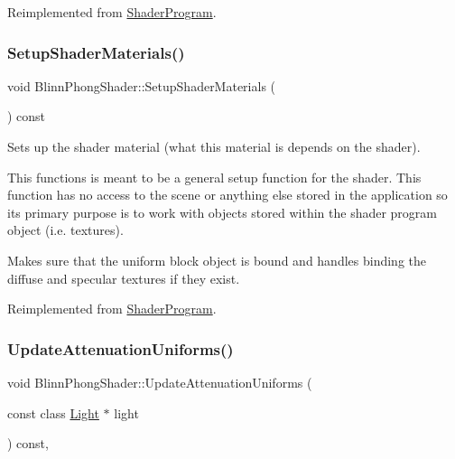 Reimplemented from \hyperlink{class_shader_program_a02cf3df43c59808160fce158ad655a40}{Shader\+Program}.

\hypertarget{class_blinn_phong_shader_a444db9ffe3d55dbbb55ced8cf4abb705}{}\label{class_blinn_phong_shader_a444db9ffe3d55dbbb55ced8cf4abb705}
\subsubsection{\texorpdfstring{Setup\+Shader\+Materials()}{SetupShaderMaterials()}}
{\footnotesize\ttfamily void Blinn\+Phong\+Shader\+::\+Setup\+Shader\+Materials (\begin{DoxyParamCaption}{ }\end{DoxyParamCaption}) const\hspace{0.3cm}{\ttfamily [virtual]}}



Sets up the shader material (what this material is depends on the shader).

This functions is meant to be a general setup function for the shader. This function has no access to the scene or anything else stored in the application so its primary purpose is to work with objects stored within the shader program object (i.\+e. textures).

Makes sure that the uniform block object is bound and handles binding the diffuse and specular textures if they exist.

Reimplemented from \hyperlink{class_shader_program_a20ea5669f122fa6143e7fa8ee9d92578}{Shader\+Program}.

\hypertarget{class_blinn_phong_shader_a389b3b5fea85eb6deedfc028c4140632}{}\label{class_blinn_phong_shader_a389b3b5fea85eb6deedfc028c4140632}
\subsubsection{\texorpdfstring{Update\+Attenuation\+Uniforms()}{UpdateAttenuationUniforms()}}
{\footnotesize\ttfamily void Blinn\+Phong\+Shader\+::\+Update\+Attenuation\+Uniforms (\begin{DoxyParamCaption}\item[{const class \hyperlink{class_light}{Light} $\ast$}]{light }\end{DoxyParamCaption}) const\hspace{0.3cm}{\ttfamily [protected]}, {\ttfamily [virtual]}}

